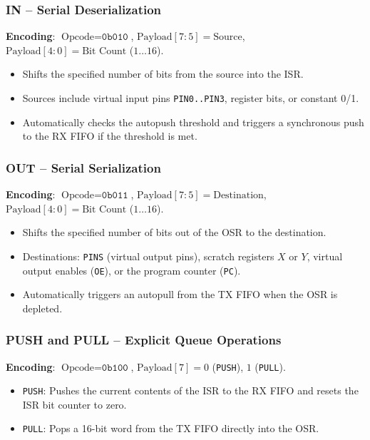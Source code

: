 \documentclass[11pt,a4paper]{article}
\begin{document}
\subsubsection{IN -- Serial Deserialization}
\textbf{Encoding}: $\text{Opcode} = \texttt{0b010}$, $\text{Payload}[7:5] = \text{Source}$, $\text{Payload}[4:0] = \text{Bit Count}$ ($1 \dots 16$).
\begin{itemize}
    \item Shifts the specified number of bits from the source into the ISR.
    \item Sources include virtual input pins \texttt{PIN0..PIN3}, register bits, or constant 0/1.
    \item Automatically checks the autopush threshold and triggers a synchronous push to the RX FIFO if the threshold is met.
\end{itemize}

\subsubsection{OUT -- Serial Serialization}
\textbf{Encoding}: $\text{Opcode} = \texttt{0b011}$, $\text{Payload}[7:5] = \text{Destination}$, $\text{Payload}[4:0] = \text{Bit Count}$ ($1 \dots 16$).
\begin{itemize}
    \item Shifts the specified number of bits out of the OSR to the destination.
    \item Destinations: \texttt{PINS} (virtual output pins), scratch registers $X$ or $Y$, virtual output enables (\texttt{OE}), or the program counter (\texttt{PC}).
    \item Automatically triggers an autopull from the TX FIFO when the OSR is depleted.
\end{itemize}

\subsubsection{PUSH and PULL -- Explicit Queue Operations}
\textbf{Encoding}: $\text{Opcode} = \texttt{0b100}$, $\text{Payload}[7] = 0$ (\texttt{PUSH}), $1$ (\texttt{PULL}).
\begin{itemize}
    \item \texttt{PUSH}: Pushes the current contents of the ISR to the RX FIFO and resets the ISR bit counter to zero.
    \item \texttt{PULL}: Pops a 16-bit word from the TX FIFO directly into the OSR.
\end{itemize}
\end{document}
